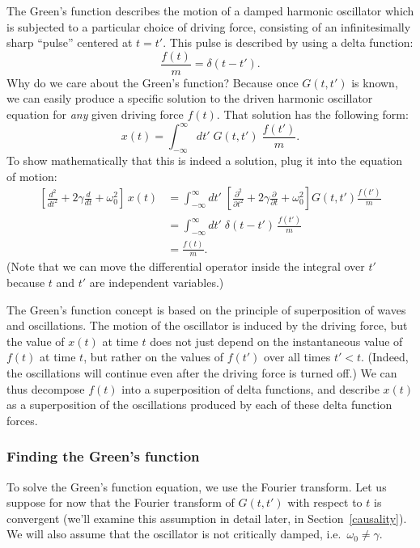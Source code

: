 \documentclass[10pt,a4paper]{article}
\begin{document}
The Green's function describes the motion of a damped harmonic
oscillator which is subjected to a particular choice of driving force,
consisting of an infinitesimally sharp ``pulse'' centered at $t = t'$.
This pulse is described by using a delta function:
\begin{equation}
\frac{f(t)}{m} = \delta(t-t').
\end{equation}
Why do we care about the Green's function? Because once $G(t,t')$ is
known, we can easily produce a specific solution to the driven harmonic
oscillator equation for \emph{any} given driving force $f(t)$. That
solution has the following form:
\begin{equation}
x(t) = \int^\infty_{-\infty} dt' \; G(t,t') \; \frac{f(t')}{m}.
\end{equation}
To show mathematically that this is indeed a solution, plug it into the
equation of motion:
\begin{align}
  \left[\frac{d^2}{dt^2} + 2 \gamma \frac{d}{dt} + \omega_0^2\right]\, x(t) &= \int^\infty_{-\infty} dt' \; \left[\frac{\partial^2}{\partial t^2} + 2 \gamma \frac{\partial}{\partial t} + \omega_0^2\right] G(t,t') \frac{f(t')}{m} \\ &= \int^\infty_{-\infty} dt' \; \delta(t-t')\, \frac{f(t')}{m} \\ &= \frac{f(t)}{m}.
\end{align}
(Note that we can move the differential operator inside the integral
over $t'$ because $t$ and $t'$ are independent variables.)

The Green's function concept is based on the principle of superposition
of waves and oscillations. The motion of the oscillator is induced by
the driving force, but the value of $x(t)$ at time $t$ does not just
depend on the instantaneous value of $f(t)$ at time $t$, but rather
on the values of $f(t')$ over all times $t' < t$. (Indeed, the
oscillations will continue even after the driving force is turned off.)
We can thus decompose $f(t)$ into a superposition of delta functions,
and describe $x(t)$ as a superposition of the oscillations produced by
each of these delta function forces.

\subsubsection{Finding the Green's function}
\label{finding-the-greens-function}

To solve the Green's function equation, we use the Fourier
transform. Let us suppose for now that the Fourier transform of
$G(t,t')$ with respect to $t$ is convergent (we'll examine this
assumption in detail later, in Section~\ref{causality}). We will also
assume that the oscillator is not critically damped, i.e.~$\omega_0
\ne \gamma$.
\end{document}
